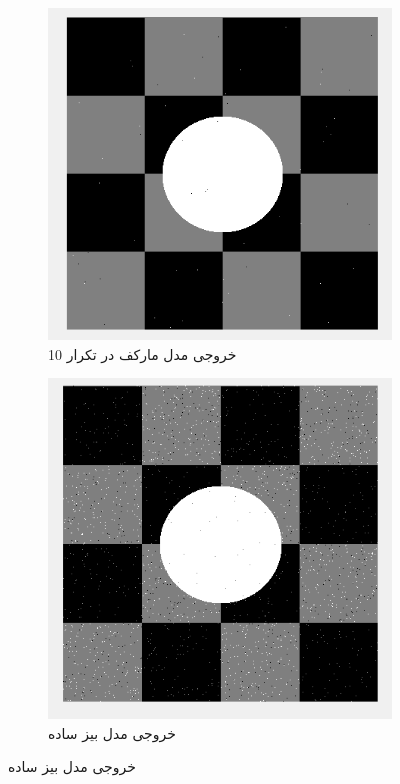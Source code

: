 \documentclass[11.5pt,a4paper]{article}
\begin{document}
\begin{figure}[h]
\center
	\begin{subfigure}{0.3\textwidth}
		\includegraphics[scale=0.3]{Imgs/MRF_Iter10_Final.png}
		\caption{خروجی مدل مارکف در تکرار 10}
	\end{subfigure}
	\begin{subfigure}{0.3\textwidth}
		\includegraphics[scale=0.3]{Imgs/NB_S01_Res.png}
		\caption{خروجی مدل بیز ساده}

\end{subfigure}
\end{figure}
\end{document}
